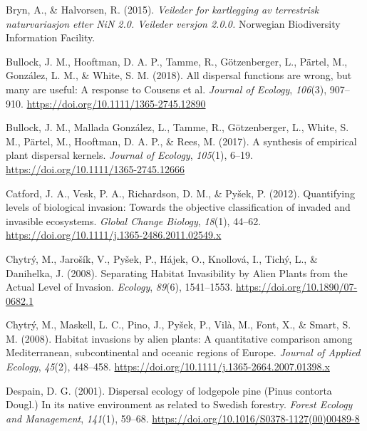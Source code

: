 \documentclass[
]{article}
\begin{document}
\leavevmode\hypertarget{ref-brynVeilederKartleggingAv2015}{}%
Bryn, A., \& Halvorsen, R. (2015). \emph{Veileder for kartlegging av terrestrisk naturvariasjon etter NiN 2.0. Veileder versjon 2.0.0.} Norwegian Biodiversity Information Facility.

\leavevmode\hypertarget{ref-bullockAllDispersalFunctions2018}{}%
Bullock, J. M., Hooftman, D. A. P., Tamme, R., Götzenberger, L., Pärtel, M., González, L. M., \& White, S. M. (2018). All dispersal functions are wrong, but many are useful: A response to Cousens et al. \emph{Journal of Ecology}, \emph{106}(3), 907--910. \url{https://doi.org/10.1111/1365-2745.12890}

\leavevmode\hypertarget{ref-bullockSynthesisEmpiricalPlant2017}{}%
Bullock, J. M., Mallada González, L., Tamme, R., Götzenberger, L., White, S. M., Pärtel, M., Hooftman, D. A. P., \& Rees, M. (2017). A synthesis of empirical plant dispersal kernels. \emph{Journal of Ecology}, \emph{105}(1), 6--19. \url{https://doi.org/10.1111/1365-2745.12666}

\leavevmode\hypertarget{ref-catfordQuantifyingLevelsBiological2012}{}%
Catford, J. A., Vesk, P. A., Richardson, D. M., \& Pyšek, P. (2012). Quantifying levels of biological invasion: Towards the objective classification of invaded and invasible ecosystems. \emph{Global Change Biology}, \emph{18}(1), 44--62. \url{https://doi.org/10.1111/j.1365-2486.2011.02549.x}

\leavevmode\hypertarget{ref-chytrySeparatingHabitatInvasibility2008}{}%
Chytrý, M., Jarošík, V., Pyšek, P., Hájek, O., Knollová, I., Tichý, L., \& Danihelka, J. (2008). Separating Habitat Invasibility by Alien Plants from the Actual Level of Invasion. \emph{Ecology}, \emph{89}(6), 1541--1553. \url{https://doi.org/10.1890/07-0682.1}

\leavevmode\hypertarget{ref-chytryHabitatInvasionsAlien2008}{}%
Chytrý, M., Maskell, L. C., Pino, J., Pyšek, P., Vilà, M., Font, X., \& Smart, S. M. (2008). Habitat invasions by alien plants: A quantitative comparison among Mediterranean, subcontinental and oceanic regions of Europe. \emph{Journal of Applied Ecology}, \emph{45}(2), 448--458. \url{https://doi.org/10.1111/j.1365-2664.2007.01398.x}

\leavevmode\hypertarget{ref-despainDispersalEcologyLodgepole2001}{}%
Despain, D. G. (2001). Dispersal ecology of lodgepole pine (Pinus contorta Dougl.) In its native environment as related to Swedish forestry. \emph{Forest Ecology and Management}, \emph{141}(1), 59--68. \url{https://doi.org/10.1016/S0378-1127(00)00489-8}
\end{document}
